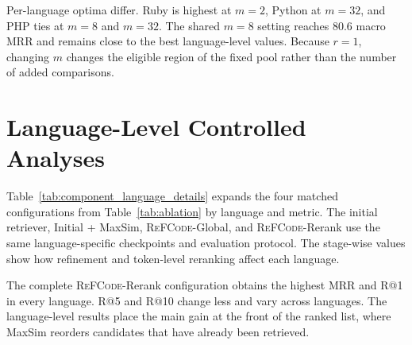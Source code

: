 \documentclass[11pt]{article}
\newcommand{\method}{\textsc{ReFCode}}
\begin{document}
Per-language optima differ. Ruby is highest at \(m=2\), Python at \(m=32\), and PHP ties at \(m=8\) and \(m=32\). The shared \(m=8\) setting reaches 80.6 macro MRR and remains close to the best language-level values. Because \(r=1\), changing \(m\) changes the eligible region of the fixed pool rather than the number of added comparisons.

\section{Language-Level Controlled Analyses}
\label{app:component_details}

Table~\ref{tab:component_language_details} expands the four matched configurations from Table~\ref{tab:ablation} by language and metric. The initial retriever, Initial + MaxSim, \method{}-Global, and \method{}-Rerank use the same language-specific checkpoints and evaluation protocol. The stage-wise values show how refinement and token-level reranking affect each language.

The complete \method{}-Rerank configuration obtains the highest MRR and R@1 in every language. R@5 and R@10 change less and vary across languages. The language-level results place the main gain at the front of the ranked list, where MaxSim reorders candidates that have already been retrieved.
\end{document}
